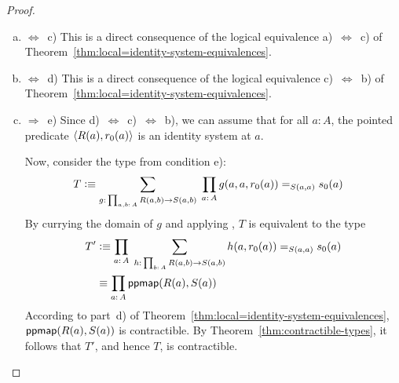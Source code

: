 \begin{proof}
\begin{enumerate}[a),font=\upshape]
        For the computation rule of $g$, we have
        \begin{align*}
            g(a,r_0(a))
                &\equiv
                    f(a,a,r_0(a),\fun{refl}_{a})
                &&\text{; \eqref{eq:g(y,r)-defn}}\\
                &\eq{}d(a,\fun{refl}_{a})
                &&\text{; comp.~rule for $f$}\\
                &\equiv c_0
                &&\text{; \eqref{eq:global-base-case}.}
        \end{align*}
        Thus, $\dep{R(a),r_0(a)}$ is an identity system at $a$.

        \item $\Leftrightarrow$~c) This is a direct consequence of the logical equivalence a)~$\Leftrightarrow$~c) of Theorem~\ref{thm:local=identity-system-equivalences}.

        \item $\Leftrightarrow$~d) This is a direct consequence of the logical equivalence c)~$\Leftrightarrow$~b) of Theorem~\ref{thm:local=identity-system-equivalences}.

        \item $\Rightarrow$~e) Since d)~$\Leftrightarrow$~c)~$\Leftrightarrow$~b), we can assume that for all $a\colon A$, the pointed predicate $\dep{R(a),r_0(a)}$ is an identity system at $a$.
    
        Now, consider the type from condition e):
        \begin{align*}
            T&\defeq
                \sum_{g\colon\prod_{a,b\colon A}
                    R(a,b)\to S(a,b)}\;
                    \prod_{a\colon A}
                        g(a,a,r_0(a))
                        \eq{S(a,a)}
                        s_0(a)
        \end{align*}
        By currying the domain of $g$ and applying , $T$ is equivalent to the type
        \begin{align*}
            T'&\defeq
                \prod_{a\colon A}\;
                \sum_{
                    h\colon\prod_{b\colon A}
                        R(a,b)\to S(a,b)
                    }h(a,r_0(a))\eq{S(a,a)}s_0(a)\\
                &\equiv\prod_{a\colon A}\fun{ppmap}
                    (R(a),S(a))   
        \end{align*}
        According to part~d) of Theorem~\ref{thm:local=identity-system-equivalences}, $\mathsf{ppmap}(R(a),S(a))$ is contractible. By Theorem~\ref{thm:contractible-types}, it follows that $T'$, and hence $T$, is contractible.


\end{enumerate}
\end{proof}
